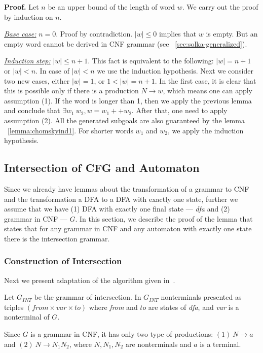 \textbf{Proof.} 
Let $n$ be an upper bound of the length of word $w$. We carry out the proof by induction on $n$.

\underline{\textit{Base case:}} $ n = 0 $. Proof by contradiction. $|w| \le 0$ implies that $w$ is empty. But an empty word cannot be derived in CNF grammar (see ~\ref{sec:solka-generalized}).


\underline{\textit{Induction step:}} $|w| \le n+1$. This fact is equivalent to the following:  $|w| = n+1$ or $|w| < n$. 
In case of $|w| < n$ we use the induction hypothesis.
Next we consider two new cases, either $|w| = 1 $, or $1 < |w| = n + 1$.
In the first case, it is clear that this is possible only if there is a production $N \to w$, which means one can apply assumption (1).
If the word is longer than 1, then we apply the previous lemma and conclude that $\exists w_1 \ w_2, w = w_1 ++ w_2$. After that,
one need to apply assumption (2). All the generated subgoals are also guaranteed by the lemma ~\ref{lemma:chomskyind1}. 
For shorter words $w_1$ and $w_2$, we apply the induction hypothesis.

\subsection{Intersection of CFG and Automaton}

Since we already have lemmas about the transformation of a grammar to CNF and the transformation a DFA to a DFA with exactly one state, further we assume that we have (1) DFA with exactly one final state --- \textit{dfa} and (2) grammar in CNF --- $G$. In this section, we describe the proof of the lemma that states that for any grammar in CNF and any automaton with exactly one state there is the intersection grammar.

\subsubsection{Construction of Intersection}

Next we present adaptation of the algorithm given in~\cite{beigelproof}. 

Let $G_{INT}$ be the grammar of intersection. In $G_{INT}$ nonterminals presented as triples $(from \times var \times to) $ where \textit{from} and $to$ are states of \textit{dfa}, and \textit{var} is a nonterminal of $G$.

Since $G$ is a grammar in CNF, it has only two type of productions: $(1)\ N \to a $ and $(2) \ N \to N_{1} N_{2}$, where $N, N_1, N_2$ are nonterminals and $a$ is a terminal.

